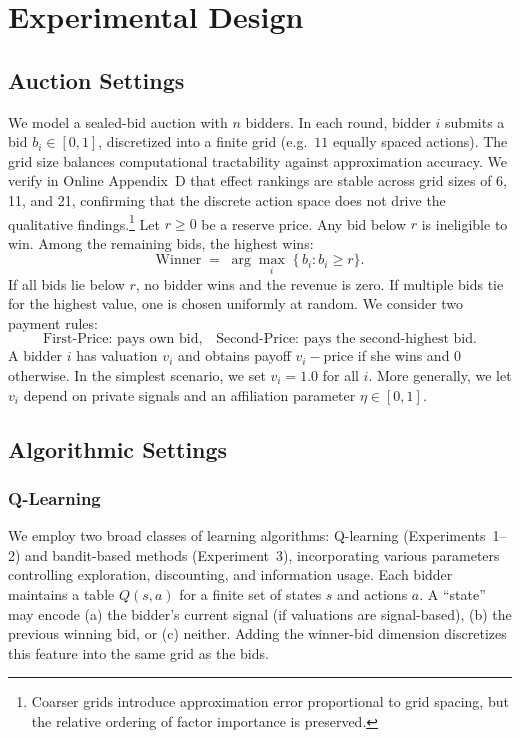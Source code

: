 \section{Experimental Design}

\subsection{Auction Settings}
We model a sealed-bid auction with $n$ bidders. In each round, bidder $i$ submits a bid $b_i \in [0,1]$, discretized into a finite grid (e.g.\ $11$ equally spaced actions). The grid size balances computational tractability against approximation accuracy. We verify in Online Appendix~D that effect rankings are stable across grid sizes of 6, 11, and 21, confirming that the discrete action space does not drive the qualitative findings.\footnote{Coarser grids introduce approximation error proportional to grid spacing, but the relative ordering of factor importance is preserved.} Let $r \ge 0$ be a reserve price. Any bid below $r$ is ineligible to win. Among the remaining bids, the highest wins:
\[
\text{Winner} \;=\;\arg\max_i\; \{\,b_i : b_i \ge r\}.
\]
If all bids lie below $r$, no bidder wins and the revenue is zero. If multiple bids tie for the highest value, one is chosen uniformly at random. We consider two payment rules:
\[
\text{First-Price: pays own bid,}
\quad
\text{Second-Price: pays the second-highest bid.}
\]
A bidder $i$ has valuation $v_i$ and obtains payoff $v_i - \text{price}$ if she wins and $0$ otherwise. In the simplest scenario, we set $v_i = 1.0$ for all $i$. More generally, we let $v_i$ depend on private signals and an affiliation parameter $\eta \in [0,1]$.

\subsection{Algorithmic Settings}

\subsubsection{Q-Learning}
We employ two broad classes of learning algorithms: Q-learning (Experiments~1--2) and bandit-based methods (Experiment~3), incorporating various parameters controlling exploration, discounting, and information usage. Each bidder maintains a table $Q(s,a)$ for a finite set of states $s$ and actions $a$. A “state” may encode (a) the bidder’s current signal (if valuations are signal-based), (b) the previous winning bid, or (c) neither. Adding the winner-bid dimension discretizes this feature into the same grid as the bids.

